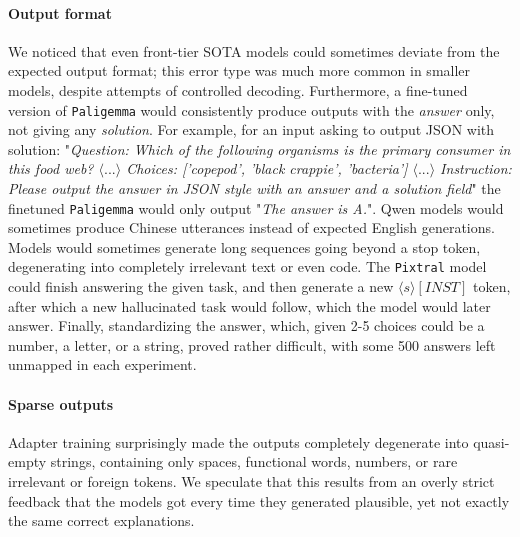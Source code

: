 \documentclass{article}
\begin{document}
\paragraph{Output format}
We noticed that even front-tier SOTA models could sometimes deviate from the expected output format; this error type was much more common in smaller models, despite attempts of controlled decoding. Furthermore, a fine-tuned version of \texttt{Paligemma} would consistently produce outputs with the \textit{answer} only, not giving any \textit{solution}.
For example, for an input asking to output JSON with solution: "\textit{Question: Which of the following organisms is the primary consumer in this food web? $\langle...\rangle$ Choices: ['copepod', 'black crappie', 'bacteria'] $\langle...\rangle$  Instruction:  Please output the answer in JSON style with an answer and a solution field}" the finetuned \texttt{Paligemma} would only output "\textit{The answer is A.}".
Qwen models would sometimes produce Chinese utterances instead of expected English generations. 
\newline
\newline 
Models would sometimes generate long sequences going beyond a stop token, degenerating into completely irrelevant text or even code. The \texttt{Pixtral} model could finish answering the given task, and then generate a new $\langle s\rangle[INST]$ token, after which a new hallucinated task would follow, which the model would later answer.
Finally, standardizing the answer, which, given 2-5 choices could be a number, a letter, or a string, proved rather difficult, with some 500 answers left unmapped in each experiment. 
\paragraph{Sparse outputs}
Adapter training surprisingly made the outputs completely degenerate into quasi-empty strings, containing only spaces, functional words, numbers, or rare irrelevant or foreign tokens.
We speculate that this results from an overly strict feedback that the models got every time they generated plausible, yet not exactly the same correct explanations. 
\end{document}
